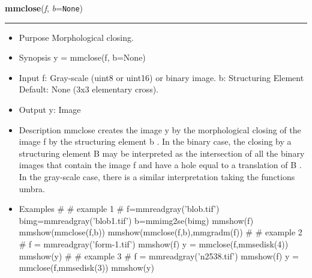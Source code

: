     \label{multireg:num_pymorph:mmclose}
    \vspace{0.5ex}

    \begin{boxedminipage}{\textwidth}

    \raggedright \textbf{mmclose}(\textit{f}, \textit{b}=\texttt{N\-o\-n\-e\-})

    \vspace{-1.5ex}

    \rule{\textwidth}{0.5\fboxrule}
    \begin{itemize}
    \setlength{\parskip}{0.6ex}
      \item Purpose Morphological closing.

      \item Synopsis y = mmclose(f, b=None)

      \item Input f: Gray-scale (uint8 or uint16) or binary image. b: 
        Structuring Element Default: None (3x3 elementary cross).

      \item Output y: Image

      \item Description mmclose creates the image y by the morphological 
        closing of the image f by the structuring element b . In the 
        binary case, the closing by a structuring element B may be 
        interpreted as the intersection of all the binary images that 
        contain the image f and have a hole equal to a translation of B . 
        In the gray-scale case, there is a similar interpretation taking 
        the functions umbra.

      \item Examples \# \# example 1 \# f=mmreadgray('blob.tif') 
        bimg=mmreadgray('blob1.tif') b=mmimg2se(bimg) mmshow(f) 
        mmshow(mmclose(f,b)) mmshow(mmclose(f,b),mmgradm(f)) \# \# 
        example 2 \# f = mmreadgray('form-1.tif') mmshow(f) y = 
        mmclose(f,mmsedisk(4)) mmshow(y) \# \# example 3 \# f = 
        mmreadgray('n2538.tif') mmshow(f) y = mmclose(f,mmsedisk(3)) 
        mmshow(y)

    \end{itemize}

    \vspace{1ex}

    \end{boxedminipage}

